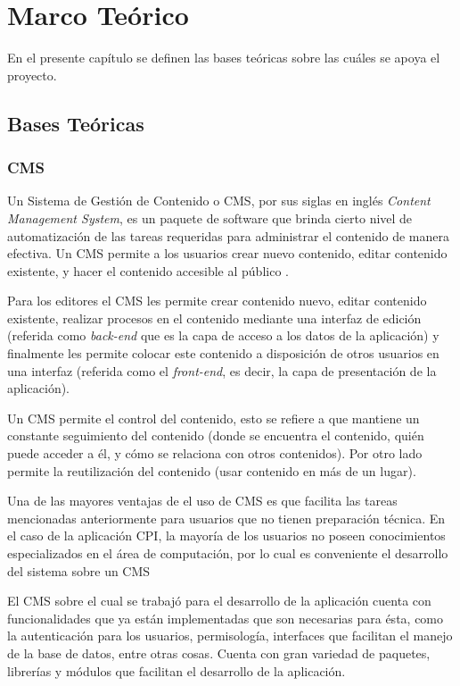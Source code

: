 \chapter{Marco Teórico}
En el presente capítulo se definen las bases teóricas sobre las cuáles se apoya el proyecto.

\section{Bases Teóricas}

\subsection{CMS}
Un Sistema de Gestión de Contenido o CMS, por sus siglas en inglés \textit{Content Management System}, es un paquete de software que brinda cierto nivel de automatización de las tareas requeridas para administrar el contenido de manera efectiva. Un CMS permite a los usuarios crear nuevo contenido, editar contenido existente, y hacer el contenido accesible al público \cite{cmsBarker}.

Para los editores el CMS les permite crear contenido nuevo, editar contenido existente, realizar procesos en el contenido mediante una interfaz de edición (referida como \textit{back-end} que es la capa de acceso a los datos de la aplicación) y finalmente les permite colocar este contenido a disposición de otros usuarios en una interfaz (referida como el \textit{front-end}, es decir, la capa de presentación de la aplicación).

Un CMS permite el control del contenido, esto se refiere a que mantiene un constante seguimiento del contenido (donde se encuentra el contenido, quién puede acceder a él, y cómo se relaciona con otros contenidos). Por otro lado permite la reutilización del contenido (usar contenido en más de un lugar).

Una de las mayores ventajas de el uso de CMS es que facilita las tareas mencionadas anteriormente para usuarios que no tienen preparación técnica. En el caso de la aplicación CPI, la mayoría de los usuarios no poseen conocimientos especializados en el área de computación, por lo cual es conveniente el desarrollo del sistema sobre un CMS

El CMS sobre el cual se trabajó para el desarrollo de la aplicación cuenta con funcionalidades que ya están implementadas que son necesarias para ésta, como la autenticación para los usuarios, permisología, interfaces que facilitan el manejo de la base de datos, entre otras cosas. Cuenta con gran variedad de paquetes, librerías y módulos que facilitan el desarrollo de la aplicación. 

